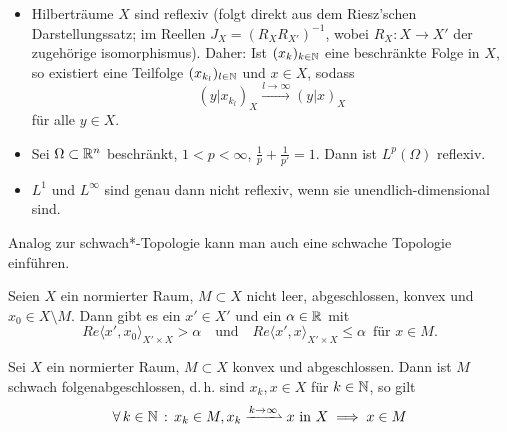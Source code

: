 \documentclass{cheat-sheet}
\newcommand{\convWeaklyWith}[1]{\xrightharpoonup{#1 \to \infty}} %
\begin{document}
\begin{bsp}
  \begin{itemize}
    \item Hilberträume $X$ sind reflexiv (folgt direkt aus dem Riesz'schen Darstellungssatz; im Reellen $J_X = (R_X R_{X'})^{-1}$, wobei $R_X : X \to X'$ der zugehörige isomorphismus). Daher: Ist $(x_k)_{k \in \mathbb{N}}$ eine beschränkte Folge in $X$, so existiert eine Teilfolge $(x_{k_l})_{l \in \mathbb{N}}$ und $x \in X$, sodass
    \[ (y | x_{k_l})_X \xrightarrow{l \to \infty} (y | x)_X \]
    für alle $y \in X$.
    \item Sei $\Omega \subset \mathbb{R}^n$ beschränkt, $1 < p < \infty$, $\tfrac{1}{p} + \tfrac{1}{p'} = 1$. Dann ist $L^p(\Omega)$ reflexiv.
    \item $L^1$ und $L^\infty$ sind genau dann nicht reflexiv, wenn sie unendlich-dimensional sind.
  \end{itemize}
\end{bsp}

\begin{bem}
  Analog zur schwach*-Topologie kann man auch eine schwache Topologie einführen.
\end{bem}




\begin{satz}[Trennungssatz]
  Seien $X$ ein normierter Raum, $M \subset X$ nicht leer, abgeschlossen, konvex und $x_0 \in X \setminus M$. Dann gibt es ein $x' \in X'$ und ein $\alpha \in \mathbb{R}$ mit
  \[ Re \langle x', x_0 \rangle_{X' \times X} > \alpha \quad \text{und} \quad Re \langle x', x \rangle_{X' \times X} \leq \alpha \enspace \text{für } x \in M. \]
\end{satz}



\begin{satz}
  Sei $X$ ein normierter Raum, $M \subset X$ konvex und abgeschlossen. Dann ist $M$ schwach folgenabgeschlossen, d.\,h. sind $x_k, x \in X$ für $k \in \mathbb{N}$, so gilt
  \[ \fa{k \in \N} x_k \in M, x_k \convWeaklyWith{k} x \text{ in } X \implies x \in M \]
\end{satz}
\end{document}
